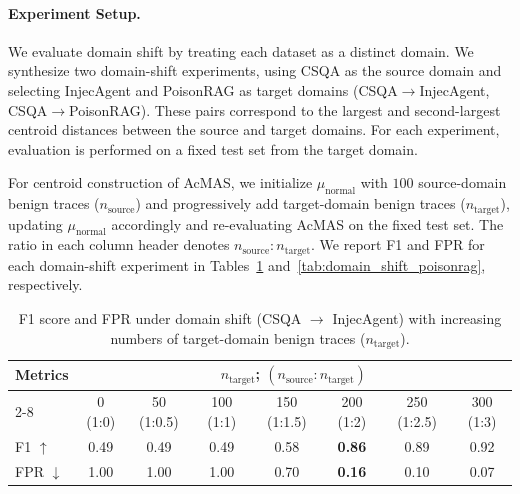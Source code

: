 \documentclass{article}
\theoremstyle{plain}
\theoremstyle{definition}
\theoremstyle{remark}
\begin{document}
\paragraph{Experiment Setup.}
We evaluate domain shift by treating each dataset as a distinct 
domain. We synthesize two domain-shift experiments, using CSQA as the 
source domain and selecting InjecAgent and PoisonRAG as target 
domains (CSQA$\rightarrow$InjecAgent, CSQA$\rightarrow$PoisonRAG). 
These pairs correspond to the largest and second-largest centroid 
distances between the source and target domains. For each experiment, 
evaluation is performed on a fixed test set from the target domain.

For centroid construction of AcMAS, we initialize $\mu_{\text{normal}}$ 
with $100$ source-domain benign traces ($n_{\text{source}}$) and 
progressively add target-domain benign traces ($n_{\text{target}}$), 
updating $\mu_{\text{normal}}$ accordingly and re-evaluating AcMAS on 
the fixed test set. The ratio in each column header denotes 
$n_{\text{source}} : n_{\text{target}}$. We report F1 and FPR for each 
domain-shift experiment in Tables~\ref{tab:domain_shift_injecagent} 
and~\ref{tab:domain_shift_poisonrag}, respectively.

\begin{table}[h]
\centering
\caption{F1 score and FPR under domain shift (CSQA $\rightarrow$ 
InjecAgent) with increasing numbers of target-domain benign traces 
($n_{\text{target}}$).}
\label{tab:domain_shift_injecagent}
\small
\setlength{\tabcolsep}{4pt}
\begin{tabular}{lccccccc}
\toprule
\multirow{2}{*}{Metrics} & \multicolumn{7}{c}{$n_{\text{target}}$; $(n_{\text{source}} : n_{\text{target}})$} \\
\cmidrule(lr){2-8}
 & 0 (1:0) & 50 (1:0.5) & 100 (1:1) & 150 (1:1.5) & 200 (1:2) & 250 (1:2.5) & 300 (1:3) \\
\midrule
F1 $\uparrow$  & 0.49 & 0.49 & 0.49 & 0.58 & \textbf{0.86} & 0.89 & 0.92 \\
FPR $\downarrow$ & 1.00 & 1.00 & 1.00 & 0.70 & \textbf{0.16} & 0.10 & 0.07 \\
\bottomrule
\end{tabular}
\end{table}
\end{document}

